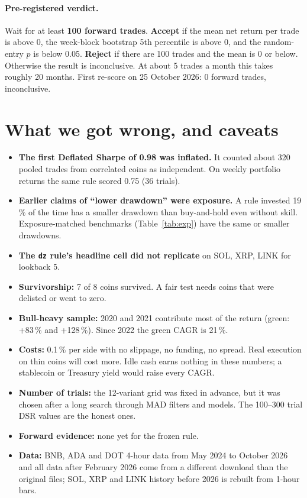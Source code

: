 \documentclass[11pt,a4paper]{article}
\newcommand{\code}[1]{\texttt{#1}}
\begin{document}
\paragraph{Pre-registered verdict.} Wait for at least \textbf{100 forward trades}. \textbf{Accept} if the mean net return per trade is above 0, the week-block bootstrap 5th percentile is above 0, and the random-entry $p$ is below 0.05.
\textbf{Reject} if there are 100 trades and the mean is 0 or below. Otherwise the result is inconclusive. At about 5 trades a month this takes roughly 20 months. First re-score on 25 October 2026: 0 forward trades, inconclusive.

\section{What we got wrong, and caveats}\label{sec:corr}
\begin{itemize}
\item \textbf{The first Deflated Sharpe of 0.98 was inflated.} It counted about 320 pooled trades from correlated coins as independent. On weekly portfolio returns the same rule scored 0.75 (36 trials).
\item \textbf{Earlier claims of ``lower drawdown'' were exposure.} A rule invested 19\,\% of the time has a smaller drawdown than buy-and-hold even without skill. Exposure-matched benchmarks (Table~\ref{tab:exp}) have the same or smaller drawdowns.
\item \textbf{The \code{dz} rule's headline cell did not replicate} on SOL, XRP, LINK for lookback 5.
\item \textbf{Survivorship:} 7 of 8 coins survived. A fair test needs coins that were delisted or went to zero.
\item \textbf{Bull-heavy sample:} 2020 and 2021 contribute most of the return (green: +83\,\% and +128\,\%). Since 2022 the green CAGR is 21\,\%.
\item \textbf{Costs:} 0.1\,\% per side with no slippage, no funding, no spread. Real execution on thin coins will cost more. Idle cash earns nothing in these numbers; a stablecoin or Treasury yield would raise every CAGR.
\item \textbf{Number of trials:} the 12-variant grid was fixed in advance, but it was chosen after a long search through MAD filters and models. The 100--300 trial DSR values are the honest ones.
\item \textbf{Forward evidence:} none yet for the frozen rule.
\item \textbf{Data:} BNB, ADA and DOT 4-hour data from May 2024 to October 2026 and all data after February 2026 come from a different download than the original files; SOL, XRP and LINK history before 2026 is rebuilt from 1-hour bars.
\end{itemize}
\end{document}
